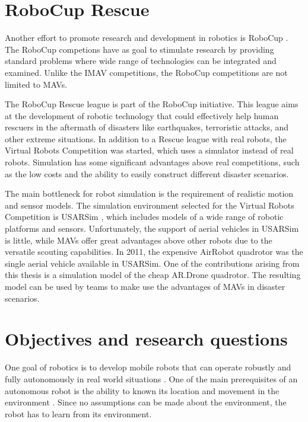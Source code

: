 	\section{RoboCup Rescue}
Another effort to promote research and development in robotics is RoboCup \cite{kitano1997robocup}.
The RoboCup competions have as goal to stimulate research by providing standard problems where wide range of technologies can be integrated and examined.
Unlike the IMAV competitions, the RoboCup competitions are not limited to MAVs.

The RoboCup Rescue league \cite{kitano1999robocup} is part of the RoboCup initiative.
This league aims at the development of robotic technology that could effectively help human rescuers in the aftermath of disasters like earthquakes, terroristic attacks, and other extreme situations.
In addition to a Rescue league with real robots, the Virtual Robots Competition was started, which uses a simulator instead of real robots.
Simulation has some significant advantages above real competitions, such as the low costs and the ability to easily construct different disaster scenarios.

The main bottleneck for robot simulation is the requirement of realistic motion and sensor models.
The simulation environment selected for the Virtual Robots Competition is USARSim \cite{Balakirsky2009iros,carpin2007usarsim}, which includes models of a wide range of robotic platforms and sensors.
Unfortunately, the support of aerial vehicles in USARSim is little, while MAVs offer great advantages above other robots due to the versatile scouting capabilities.
In 2011, the expensive AirRobot quadrotor was the single aerial vehicle available in USARSim.
One of the contributions arising from this thesis is a simulation model of the cheap AR.Drone quadrotor.
The resulting model can be used by teams to make use the advantages of MAVs in disaster scenarios.


	\section{Objectives and research questions}
One goal of robotics is to develop mobile robots that can operate robustly and fully autonomously in real world situations \cite{murphy2000introduction}.
One of the main prerequisites of an autonomous robot is the ability to known its location and movement in the environment \cite{talluri1992position}.
Since no assumptions can be made about the environment, the robot has to learn from its environment.

